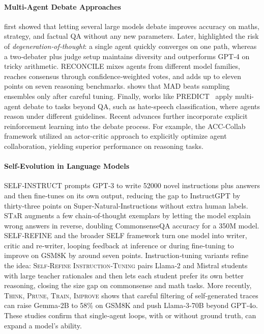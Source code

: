 \documentclass[11pt]{article}
\begin{document}
\paragraph{Multi-Agent Debate Approaches} \citet{du2023improving} first showed that letting several large models debate improves accuracy on maths, strategy, and factual QA without any new parameters. Later, \citet{liang2023encouraging} highlighted the risk of \emph{degeneration‑of‑thought}: a single agent quickly converges on one path, whereas a two‑debater plus judge setup maintains diversity and outperforms GPT‑4 on tricky arithmetic. \textsc{RECONCILE} \citep{chen2023reconcile} mixes agents from different model families, reaches consensus through confidence‑weighted votes, and adds up to eleven points on seven reasoning benchmarks. \citet{smit2023should} shows that MAD beats sampling ensembles only after careful tuning. Finally, works like PREDICT~\citep{park2024predict} apply multi-agent debate to tasks beyond QA, such as hate-speech classification, where agents reason under different guidelines. Recent advances further incorporate explicit reinforcement learning into the debate process. For example, the ACC-Collab framework \cite{estornell2024acc} utilized an actor-critic approach to explicitly optimize agent collaboration, yielding superior performance on reasoning tasks. 

\vspace{-1em}

\paragraph{Self-Evolution in Language Models} \textsc{SELF‑INSTRUCT} \citep{wang2022self} prompts GPT‑3 to write 52000 novel instructions plus answers and then fine‑tunes on its own output, reducing the gap to InstructGPT by thirty‑three points on Super‑Natural‑Instructions without extra human labels. \textsc{STaR} \citep{zelikman2024star} augments a few chain‑of‑thought exemplars by letting the model explain wrong answers in reverse, doubling CommonsenseQA accuracy for a 350M model. \textsc{SELF‑REFINE} \citep{madaan2023self} and the broader \textsc{SELF} framework \citep{lu2023self} turn one model into writer, critic and re‑writer, looping feedback at inference or during fine‑tuning to improve on GSM8K by around seven points. Instruction‑tuning variants refine the idea: \textsc{Self‑Refine Instruction‑Tuning} \citep{ranaldi2024self} pairs Llama‑2 and Mistral students with large teacher rationales and then lets each student prefer its own better reasoning, closing the size gap on commonsense and math tasks. More recently, \textsc{Think, Prune, Train, Improve} \citep{costello2025think} shows that careful filtering of self‑generated traces can raise Gemma‑2B to 58\% on GSM8K and push Llama‑3‑70B beyond GPT‑4o. These studies confirm that single‑agent loops, with or without ground truth, can expand a model’s ability. 
\end{document}
